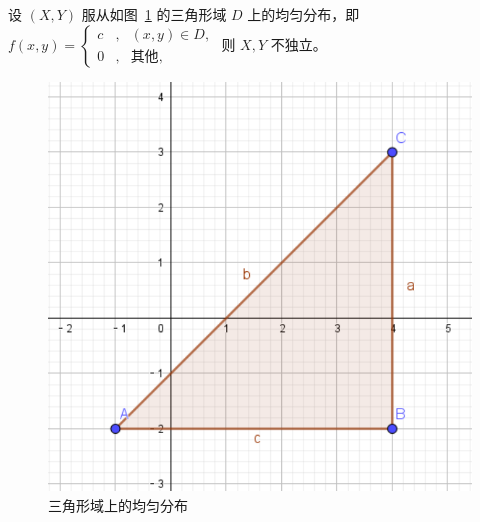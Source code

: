 \documentclass[../main.tex]{subfiles}
\begin{document}
\begin{example}
    设 $(X,Y)$ 服从如图~\ref{fig:3.6.1} 的三角形域 $D$ 上的均匀分布，即 $
        f(x,y)=\left\{
        \begin{aligned}
            c & , & (x,y)\in D,  \\
            0 & , & \text{其他},
        \end{aligned}
        \right.
    $ 则 $X,Y$ 不独立。

    \begin{figure}[!h]
        \centering
        \includegraphics[scale=0.4]{figures/triangle.pdf}
        \caption{三角形域上的均匀分布}
        \label{fig:3.6.1}
    \end{figure}
\end{example}
\end{document}
